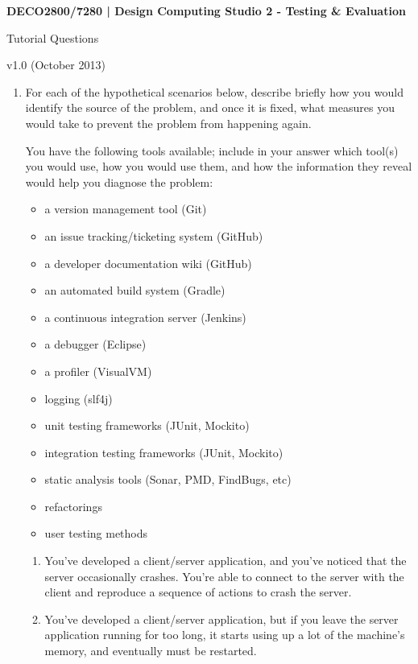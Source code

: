 \documentclass[a4paper,11pt]{article}
\begin{document}
\pagestyle{myheadings}

\begin{center}
\bf
DECO2800/7280 | Design Computing Studio 2 - Testing \& Evaluation

Tutorial Questions

v1.0 (October 2013)
\end{center}

\begin{enumerate}
\item
For each of the hypothetical scenarios below, describe briefly how you would
identify the source of the problem, and once it is fixed, what measures you
would take to prevent the problem from happening again.

You have the following tools available; include in your
answer which tool(s) you would use, how you would use them, and how the
information they reveal would help you diagnose the problem:
\begin{itemize}
\item
a version management tool (Git)
\item
an issue tracking/ticketing system (GitHub)
\item
a developer documentation wiki (GitHub)
\item
an automated build system (Gradle)
\item
a continuous integration server (Jenkins)
\item
a debugger (Eclipse)
\item
a profiler (VisualVM)
\item
logging (slf4j)
\item
unit testing frameworks (JUnit, Mockito)
\item
integration testing frameworks (JUnit, Mockito)
\item
static analysis tools (Sonar, PMD, FindBugs, etc)
\item
refactorings
\item
user testing methods
\end{itemize}

\begin{enumerate}
\item
You've developed a client/server application, and you've noticed that the
server occasionally crashes. You're able to connect to the server with the
client and reproduce a sequence of actions to crash the server.

\item
You've developed a client/server application, but if you leave the server
application running for too long, it starts using up a lot of the machine's
memory, and eventually must be restarted.


\end{enumerate}
\end{enumerate}
\end{document}
